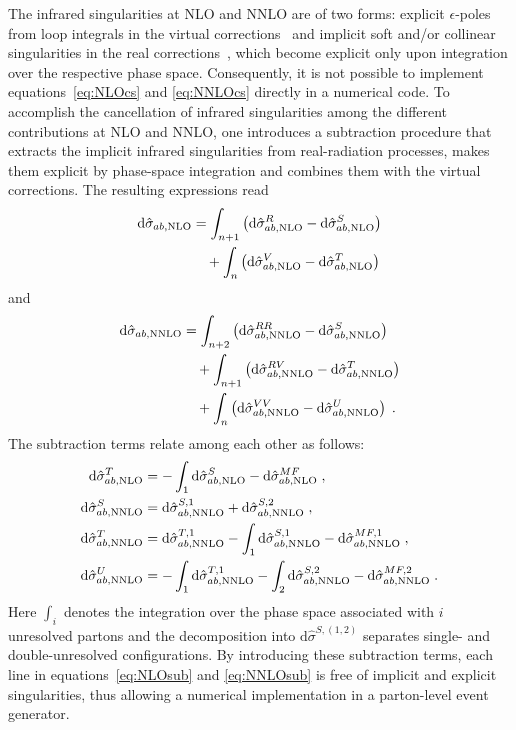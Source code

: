 \documentclass{SciPost}
\DeclareRobustCommand{\ensuremathrm}[1]{\ensuremath{\mathrm{#1}}}
\DeclareRobustCommand{\rd}{\ensuremathrm{d}}
\begin{document}
The infrared singularities at NLO and NNLO are of two forms: explicit $\epsilon$-poles from loop integrals in the virtual
corrections~\cite{Catani:1998bh} and implicit soft and/or collinear singularities
in the real corrections~\cite{Campbell:1997hg,Catani:1999ss,Catani:2000pi,Kosower:1999rx,Bern:1999ry},
which become explicit only upon integration over the respective phase space. Consequently,
it is not possible to implement equations~\eqref{eq:NLOcs} and \eqref{eq:NNLOcs} directly in a numerical code. To accomplish the cancellation of infrared singularities among the
different contributions at NLO and NNLO, one introduces a subtraction procedure that extracts the implicit infrared singularities from real-radiation processes,
makes them explicit by phase-space integration and combines them with the virtual corrections. The resulting expressions read
\begin{align}
  \label{eq:NLOsub}
  \rd\hat{\sigma}_{ab,{\rm NLO}}
  &=
  \int_{n+1} \left(
  \rd\hat{\sigma}^{R}_{ab,{\rm NLO}} - \rd\hat{\sigma}^{S}_{ab,{\rm NLO}}
  \right)
  \nonumber \\ &\quad  +
  \int_{n}\left(\rd\hat{\sigma}^{V}_{ab,{\rm NLO}}-\rd\hat{\sigma}^{T}_{ab,{\rm NLO}}\right)
\end{align}
and
\begin{align}
  \label{eq:NNLOsub}
  \rd\hat{\sigma}_{ab,{\rm NNLO}}
  &=
  \int_{n+2} \left(
  \rd\hat{\sigma}^{RR}_{ab,{\rm NNLO}} - \rd\hat{\sigma}^{S}_{ab,{\rm NNLO}}
  \right)
  \nonumber \\ &\quad +
  \int_{n+1}\left(\rd\hat{\sigma}^{RV}_{ab,{\rm NNLO}}-\rd\hat{\sigma}^{T}_{ab,{\rm NNLO}}\right)
  \nonumber \\ &\quad +
  \int_{n}\left(\rd\hat{\sigma}^{VV}_{ab,{\rm NNLO}}-\rd\hat{\sigma}^{U}_{ab,{\rm NNLO}}\right)
  \;.
\end{align}
The subtraction terms relate among each other as follows:
\begin{align}
\label{eq:sub}
  \rd\hat{\sigma}^{T}_{ab,{\rm NLO}}
  &= - \int_1 \rd\hat{\sigma}^{S}_{ab,{\rm NLO}} - \rd\hat{\sigma}^{MF}_{ab,{\rm NLO}}
  \;, \nonumber \\
  \rd\hat{\sigma}^{S}_{ab,{\rm NNLO}}
  &= \rd\hat{\sigma}^{S,1}_{ab,{\rm NNLO}} + \rd\hat{\sigma}^{S,2}_{ab,{\rm NNLO}}
  \;, \nonumber \\
  \rd\hat{\sigma}^{T}_{ab,{\rm NNLO}}
  &= \rd\hat{\sigma}^{T,1}_{ab,{\rm NNLO}} - \int_1 \rd\hat{\sigma}^{S,1}_{ab,{\rm NNLO}} - \rd\hat{\sigma}^{MF,1}_{ab,{\rm NNLO}}
  \;, \nonumber \\
  \rd\hat{\sigma}^{U}_{ab,{\rm NNLO}}
  &= - \int_1 \rd\hat{\sigma}^{T,1}_{ab,{\rm NNLO}} - \int_2 \rd\hat{\sigma}^{S,2}_{ab,{\rm NNLO}} - \rd\hat{\sigma}^{MF,2}_{ab,{\rm NNLO}}
  \;.
\end{align}
Here $\int_i$ denotes the integration over the phase space associated with $i$ unresolved partons and the decomposition into $\rd\hat{\sigma}^{S,(1,2)}$ separates
single- and double-unresolved configurations.
By introducing these subtraction terms, each line in equations~\eqref{eq:NLOsub} and \eqref{eq:NNLOsub} is free of implicit and explicit singularities, thus allowing a numerical
implementation in a parton-level event generator.
\end{document}
